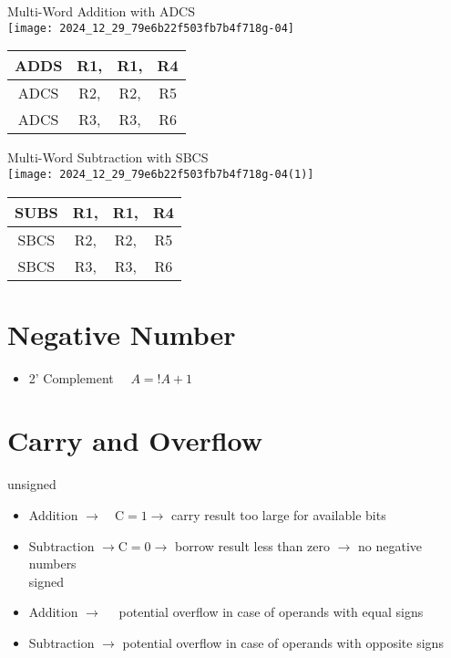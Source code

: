 Multi-Word Addition with ADCS\\
\texttt{[image: 2024\_12\_29\_79e6b22f503fb7b4f718g-04]}

\begin{center}
\begin{tabular}{|c|c|c|c|}
\hline
ADDS & R1, & R1, & R4 \\
\hline
ADCS & R2, & R2, & R5 \\
\hline
ADCS & R3, & R3, & R6 \\
\hline
\end{tabular}
\end{center}

Multi-Word Subtraction with SBCS\\
\texttt{[image: 2024\_12\_29\_79e6b22f503fb7b4f718g-04(1)]}

\begin{center}
\begin{tabular}{|c|c|c|c|}
\hline
SUBS & R1, & R1, & R4 \\
\hline
SBCS & R2, & R2, & R5 \\
\hline
SBCS & R3, & R3, & R6 \\
\hline
\end{tabular}
\end{center}

\section*{Negative Number}
\begin{itemize}
  \item 2' Complement $\quad A=!A+1$
\end{itemize}

\section*{Carry and Overflow}
unsigned

\begin{itemize}
  \item Addition $\rightarrow \quad \mathrm{C}=1 \rightarrow$ carry result too large for available bits
  \item Subtraction $\rightarrow \mathrm{C}=0 \rightarrow$ borrow result less than zero $\rightarrow$ no negative numbers\\
signed
  \item Addition $\rightarrow \quad$ potential overflow in case of operands with equal signs
  \item Subtraction $\rightarrow$ potential overflow in case of operands with opposite signs
\end{itemize}

